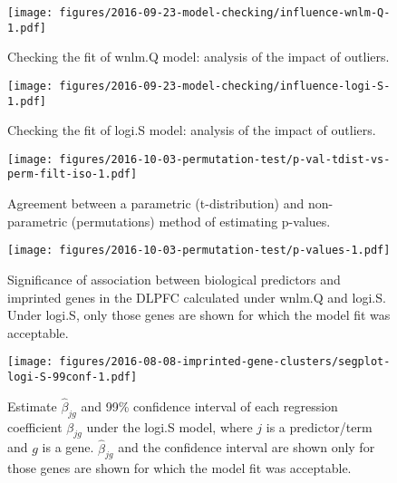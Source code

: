\documentclass[12pt,letterpaper]{article}
\begin{document}
\begin{figure}[h]
\begin{center}
\texttt{[image: figures/2016-09-23-model-checking/influence-wnlm-Q-1.pdf]}
\end{center}
\caption{
Checking the fit of wnlm.Q model: analysis of the impact of outliers.
}
\label{fig:influence-wnlm.Q}
\end{figure}

\begin{figure}[h]
\begin{center}
\texttt{[image: figures/2016-09-23-model-checking/influence-logi-S-1.pdf]}
\end{center}
\caption{
Checking the fit of logi.S model: analysis of the impact of outliers.
}
\label{fig:influence-logi.S}
\end{figure}

\begin{figure}[h]
\begin{center}
\texttt{[image: figures/2016-10-03-permutation-test/p-val-tdist-vs-perm-filt-iso-1.pdf]}
\end{center}
\caption{Agreement between a parametric (t-distribution) and non-parametric
(permutations) method of estimating p-values.}
\label{fig:pval-tdist-vs-perm}
\end{figure}

\begin{figure}[h]
\begin{center}
\texttt{[image: figures/2016-10-03-permutation-test/p-values-1.pdf]}
\end{center}
\caption{
Significance of association between biological predictors and imprinted genes
in the DLPFC calculated under wnlm.Q and logi.S.  Under logi.S, only those
genes are shown for which the model fit was acceptable.
}
\label{fig:pval}
\end{figure}

\begin{figure}[h]
\begin{center}
\texttt{[image: figures/2016-08-08-imprinted-gene-clusters/segplot-logi-S-99conf-1.pdf]}
\end{center}
\caption{
Estimate \(\hat{\beta}_{jg}\) and 99\% confidence interval of each regression coefficient
\(\beta_{jg}\) under the logi.S model, where \(j\) is a predictor/term and
\(g\) is a gene.  \(\hat{\beta}_{jg}\) and the confidence interval are shown only for those
genes are shown for which the model fit was acceptable.
}
\label{fig:biol-effects-logi.S}
\end{figure}
\end{document}
